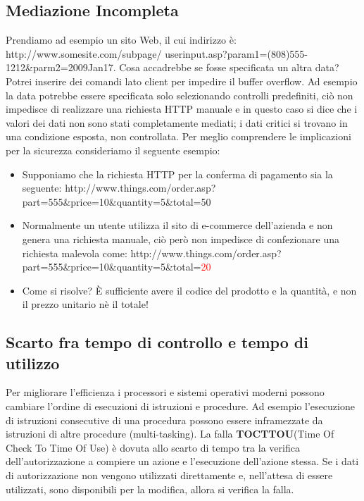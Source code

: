 \subsection{Mediazione Incompleta}
Prendiamo ad esempio un sito Web, il cui indirizzo è:
 http://www.somesite.com/subpage/
  userinput.asp?param1=(808)555-1212\&parm2=2009Jan17.
  \newline
Cosa accadrebbe se fosse specificata un altra data? Potrei inserire dei comandi  lato client per impedire il buffer overflow. Ad esempio la data potrebbe essere specificata solo selezionando controlli predefiniti, ciò non impedisce di realizzare una richiesta HTTP manuale e in questo caso si dice che i valori dei dati non sono stati completamente mediati; i dati critici si trovano in una condizione esposta, non controllata. Per meglio comprendere le implicazioni per la sicurezza consideriamo il seguente esempio:
\begin{itemize}
	\item Supponiamo che la richiesta HTTP per la conferma di pagamento sia la seguente:
	\newline
	http://www.things.com/order.asp?part=555\&price=10\&quantity=5\&total=50
	\item Normalmente un utente utilizza il sito di e-commerce dell'azienda e non genera una richiesta manuale, ciò però non impedisce di confezionare una richiesta malevola come:
	\newline
	http://www.things.com/order.asp?part=555\&price=10\&quantity=5\&total=\textcolor{red}{20}
	\item Come si risolve? \`{E} sufficiente avere il codice del prodotto e la quantità, e non il prezzo unitario nè il totale!
\end{itemize}

\subsection{Scarto fra tempo di controllo e tempo di utilizzo}
Per migliorare l'efficienza i processori e sistemi operativi moderni possono cambiare l'ordine di esecuzioni di istruzioni e procedure. Ad esempio l'esecuzione di istruzioni consecutive di una procedura possono essere inframezzate da istruzioni di altre procedure (multi-tasking).
\newline
La falla \textbf{TOCTTOU}(Time Of Check To Time Of Use) è dovuta allo scarto di tempo tra la verifica dell'autorizzazione a compiere un azione e l'esecuzione dell'azione stessa. Se i dati di autorizzazione non vengono utilizzati direttamente e, nell'attesa di essere utilizzati, sono disponibili per la modifica, allora si verifica la falla.

